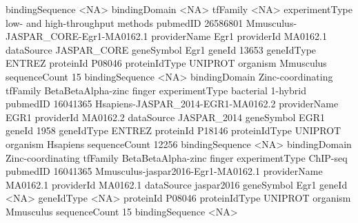 \documentclass{article}
\renewenvironment{Schunk}{\vspace{\topsep}}{\vspace{\topsep}}
\begin{document}
\begin{Schunk}
\begin{Soutput}
bindingSequence <NA>                                                
bindingDomain   <NA>                                                
tfFamily        <NA>                                                
experimentType  low- and high-throughput methods                    
pubmedID        26586801                                            
                Mmusculus-JASPAR_CORE-Egr1-MA0162.1
providerName    Egr1                               
providerId      MA0162.1                           
dataSource      JASPAR_CORE                        
geneSymbol      Egr1                               
geneId          13653                              
geneIdType      ENTREZ                             
proteinId       P08046                             
proteinIdType   UNIPROT                            
organism        Mmusculus                          
sequenceCount   15                                 
bindingSequence <NA>                               
bindingDomain   Zinc-coordinating                  
tfFamily        BetaBetaAlpha-zinc finger          
experimentType  bacterial 1-hybrid                 
pubmedID        16041365                           
                Hsapiens-JASPAR_2014-EGR1-MA0162.2
providerName    EGR1                              
providerId      MA0162.2                          
dataSource      JASPAR_2014                       
geneSymbol      EGR1                              
geneId          1958                              
geneIdType      ENTREZ                            
proteinId       P18146                            
proteinIdType   UNIPROT                           
organism        Hsapiens                          
sequenceCount   12256                             
bindingSequence <NA>                              
bindingDomain   Zinc-coordinating                 
tfFamily        BetaBetaAlpha-zinc finger         
experimentType  ChIP-seq                          
pubmedID        16041365                          
                Mmusculus-jaspar2016-Egr1-MA0162.1
providerName    MA0162.1                          
providerId      MA0162.1                          
dataSource      jaspar2016                        
geneSymbol      Egr1                              
geneId          <NA>                              
geneIdType      <NA>                              
proteinId       P08046                            
proteinIdType   UNIPROT                           
organism        Mmusculus                         
sequenceCount   15                                
bindingSequence <NA>                              

\end{Soutput}
\end{Schunk}
\end{document}
